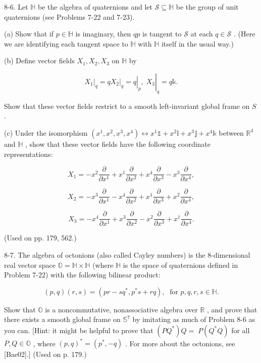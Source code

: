 \begin{exercise}
\label{prob:8-6}


8-6. Let $\mathbb{H}$ be the algebra of quaternions and let $\mathcal{S} \subseteq  \mathbb{H}$ be the group of unit quaternions (see Problems 7-22 and 7-23).

(a) Show that if $p \in  \mathbb{H}$ is imaginary, then ${qp}$ is tangent to $\mathcal{S}$ at each $q \in  \mathcal{S}$ . (Here we are identifying each tangent space to $\mathbb{H}$ with $\mathbb{H}$ itself in the usual way.)

(b) Define vector fields ${X}_{1},{X}_{2},{X}_{3}$ on $\mathbb{H}$ by

\[
{\left. {X}_{1}\right| }_{q} = q{\left. {\left. {\left. {X}_{2}\right| }_{q} = q\right| }_{p},\;{X}_{3}\right| }_{q} = q\mathbb{k}.
\]

Show that these vector fields restrict to a smooth left-invariant global frame on $S$ .

(c) Under the isomorphism $\left( {{x}^{1},{x}^{2},{x}^{3},{x}^{4}}\right)  \leftrightarrow  {x}^{1}\mathbb{1} + {x}^{2}\mathbb{i} + {x}^{3}\mathbb{j} + {x}^{4}\mathbb{k}$ between ${\mathbb{R}}^{4}$ and $\mathbb{H}$ , show that these vector fields have the following coordinate representations:

\[
{X}_{1} =  - {x}^{2}\frac{\partial }{\partial {x}^{1}} + {x}^{1}\frac{\partial }{\partial {x}^{2}} + {x}^{4}\frac{\partial }{\partial {x}^{3}} - {x}^{3}\frac{\partial }{\partial {x}^{4}},
\]

\[
{X}_{2} =  - {x}^{3}\frac{\partial }{\partial {x}^{1}} - {x}^{4}\frac{\partial }{\partial {x}^{2}} + {x}^{1}\frac{\partial }{\partial {x}^{3}} + {x}^{2}\frac{\partial }{\partial {x}^{4}},
\]

\[
{X}_{3} =  - {x}^{4}\frac{\partial }{\partial {x}^{1}} + {x}^{3}\frac{\partial }{\partial {x}^{2}} - {x}^{2}\frac{\partial }{\partial {x}^{3}} + {x}^{1}\frac{\partial }{\partial {x}^{4}}.
\]

(Used on pp. 179, 562.)
\end{exercise}

\begin{exercise}
\label{prob:8-7}


8-7. The algebra of octonions (also called Cayley numbers) is the 8-dimensional real vector space $\mathbb{O} = \mathbb{H} \times  \mathbb{H}$ (where $\mathbb{H}$ is the space of quaternions defined in Problem 7-22) with the following bilinear product:

\[
\left( {p, q}\right) \left( {r, s}\right)  = \left( {{pr} - s{q}^{ * },{p}^{ * }s + {rq}}\right) ,\;\text{ for }p, q, r, s \in  \mathbb{H}. \tag{8.20}
\]

Show that $\mathbb{O}$ is a noncommutative, nonassociative algebra over $\mathbb{R}$ , and prove that there exists a smooth global frame on ${\mathbb{S}}^{7}$ by imitating as much of Problem 8-6 as you can. [Hint: it might be helpful to prove that $\left( {P{Q}^{ * }}\right) Q = \; P\left( {{Q}^{ * }Q}\right)$ for all $P, Q \in  \mathbb{O}$ , where ${\left( p, q\right) }^{ * } = \left( {{p}^{ * }, - q}\right)$ . For more about the octonions, see [Bae02].] (Used on p. 179.)
\end{exercise}

